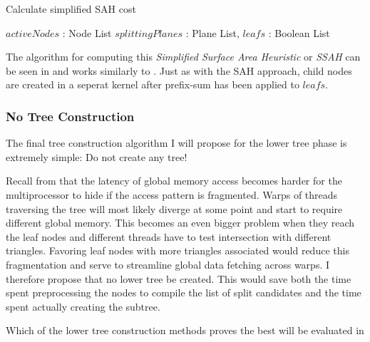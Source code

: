 \begin{algorithm}
  \caption{Calculate simplified SAH cost}
  \label{alg:calcBalancedCost}
  \begin{algorithmic}
              {$activeNodes$ : Node List}
              {$splittingPlanes$ : Plane List, $leafs$ : Boolean List}{
                  \ENDFOR
                \ENDFOR
              }
  \end{algorithmic}
\end{algorithm}


The algorithm for computing this \textit{Simplified Surface Area Heuristic} or
\textit{SSAH} can be seen in  and works similarly
to . Just as with the SAH approach, child nodes are
created in a seperat kernel after prefix-sum has been applied to $leafs$.

\subsubsection{No Tree Construction}

The final tree construction algorithm I will propose for the lower tree phase is
extremely simple: Do not create any tree!

Recall from  that the latency of global memory
access becomes harder for the multiprocessor to hide if the access pattern is
fragmented. Warps of threads traversing the tree will most likely diverge at
some point and start to require different global memory. This becomes an even
bigger problem when they reach the leaf nodes and different threads have to test
intersection with different triangles. Favoring leaf nodes with more triangles
associated would reduce this fragmentation and serve to streamline global data
fetching across warps. I therefore propose that no lower tree be created. This
would save both the time spent preprocessing the nodes to compile the list of
split candidates and the time spent actually creating the subtree.

Which of the lower tree construction methods proves the best will be evaluated
in 



